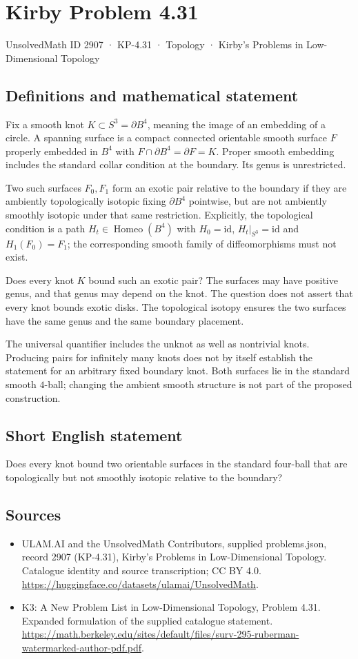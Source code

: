 \documentclass[11pt,a4paper]{article}
\begin{document}
\section*{Kirby Problem 4.31}\label{2907}
{\small UnsolvedMath ID 2907 · KP-4.31 · Topology · Kirby's Problems in Low-Dimensional Topology}
\subsection{Definitions and mathematical statement}
Fix a smooth knot $K\subset S^3=\partial B^4$, meaning the image of
an embedding of a circle. A spanning surface is a compact connected
orientable smooth surface $F$ properly embedded in $B^4$ with
$F\cap\partial B^4=\partial F=K$. Proper smooth embedding includes
the standard collar condition at the boundary. Its genus is unrestricted.

Two such surfaces $F_0,F_1$ form an exotic pair relative to the
boundary if they are ambiently topologically isotopic fixing
$\partial B^4$ pointwise, but are not ambiently smoothly isotopic
under that same restriction. Explicitly, the topological condition is
a path $H_t\in\operatorname{Homeo}(B^4)$ with $H_0=\mathrm{id}$,
$H_t|_{S^3}=\mathrm{id}$ and $H_1(F_0)=F_1$; the corresponding
smooth family of diffeomorphisms must not exist.

Does every knot $K$ bound such an exotic pair? The surfaces may
have positive genus, and that genus may depend on the knot. The
question does not assert that every knot bounds exotic disks.
The topological isotopy ensures the two surfaces have the same genus
and the same boundary placement.

The universal quantifier includes the unknot as well as nontrivial
knots. Producing pairs for infinitely many knots does not by itself
establish the statement for an arbitrary fixed boundary knot. Both
surfaces lie in the standard smooth $4$-ball; changing the ambient
smooth structure is not part of the proposed construction.
\subsection{Short English statement}
Does every knot bound two orientable surfaces in the standard four-ball that are topologically but not smoothly isotopic relative to the boundary?
\subsection{Sources}
\begin{itemize}
\item[S1] ULAM.AI and the UnsolvedMath Contributors, supplied problems.json, record 2907 (KP-4.31), Kirby's Problems in Low-Dimensional Topology. Catalogue identity and source transcription; CC BY 4.0.
\url{https://huggingface.co/datasets/ulamai/UnsolvedMath}.
\item[S2] K3: A New Problem List in Low-Dimensional Topology, Problem 4.31. Expanded formulation of the supplied catalogue statement.
\url{https://math.berkeley.edu/sites/default/files/surv-295-ruberman-watermarked-author-pdf.pdf}.
\end{itemize}
\end{document}
